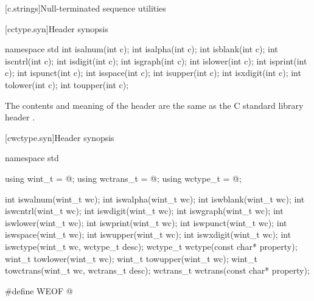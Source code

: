 [c.strings]{Null-terminated sequence utilities}

[cctype.syn]{Header  synopsis}

%
%
%
%
%
%
%
%
%
%
%
%
%
%
\begin{codeblock}
namespace std {
  int isalnum(int c);
  int isalpha(int c);
  int isblank(int c);
  int iscntrl(int c);
  int isdigit(int c);
  int isgraph(int c);
  int islower(int c);
  int isprint(int c);
  int ispunct(int c);
  int isspace(int c);
  int isupper(int c);
  int isxdigit(int c);
  int tolower(int c);
  int toupper(int c);
}
\end{codeblock}

\pnum
The contents and meaning of the header 
are the same as the C standard library header .


[cwctype.syn]{Header  synopsis}

%
%
%
%
%
%
%
%
%
%
%
%
%
%
%
%
%
%
%
%
%
%
\begin{codeblock}
namespace std {
  using wint_t = @\seebelow@;
  using wctrans_t = @\seebelow@;
  using wctype_t = @\seebelow@;

  int iswalnum(wint_t wc);
  int iswalpha(wint_t wc);
  int iswblank(wint_t wc);
  int iswcntrl(wint_t wc);
  int iswdigit(wint_t wc);
  int iswgraph(wint_t wc);
  int iswlower(wint_t wc);
  int iswprint(wint_t wc);
  int iswpunct(wint_t wc);
  int iswspace(wint_t wc);
  int iswupper(wint_t wc);
  int iswxdigit(wint_t wc);
  int iswctype(wint_t wc, wctype_t desc);
  wctype_t wctype(const char* property);
  wint_t towlower(wint_t wc);
  wint_t towupper(wint_t wc);
  wint_t towctrans(wint_t wc, wctrans_t desc);
  wctrans_t wctrans(const char* property);
}

#define WEOF @\seebelow@
\end{codeblock}


